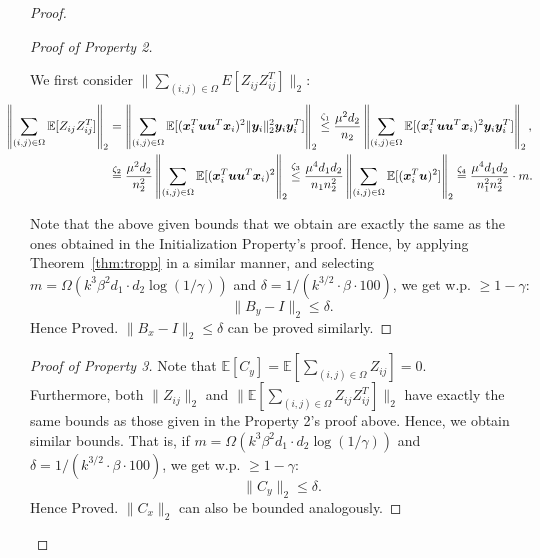 \documentclass[11pt]{article}
\newcommand{\e}{\bm{e}}
\newcommand{\tp}[1]{{#1}^{T}}
\newcommand{\E}{\mathbb{E}}
\renewcommand{\u}{\bm{u}}
\newcommand{\Vot}{\tp{V}_*}
\newcommand{\So}{\Sigma_*}
\newcommand{\Uo}{U_*}
\newcommand{\xti}{\tp{\x}_i}
\newcommand{\yti}{\tp{\y}_i}
\newcommand{\ytj}{\tp{\y}_j}
\newcommand{\Wo}{W_*}
\newcommand{\x}{\bm{x}}
\newcommand{\y}{\bm{y}}
\newcommand{\xit}{\tp{\x}_i}
\newcommand{\yi}{\y_i}
\begin{document}
\begin{proof}
\begin{proof}[Proof of Property 2]
\begin{itemize}
We first consider $\|\sum_{(i,j)\in \Omega}E[Z_{ij}Z_{ij}^T]\|_2$:
\begin{align}
\hspace*{-20pt}\left\|\sum_{(i,j)\in \Omega}\E[Z_{ij}Z_{ij}^T]\right\|_2&=\left\|\sum_{(i,j)\in \Omega}\E[(\xit\u\u^T\x_i)^2\|\y_i\|_2^2 \yi\yti]\right\|_2\stackrel{\zeta_1}{\leq}\frac{\mu^2d_2}{n_2}\left\|\sum_{(i,j)\in \Omega}\E[(\xit\u\u^T\x_i)^2\yi\yti]\right\|_2,\nonumber\\
&\stackrel{\zeta_2}{=}\frac{\mu^2d_2}{n_2^2}\left\|\sum_{(i,j)\in \Omega}\E[(\xit\u\u^T\x_i)^2\right\|_2\stackrel{\zeta_3}{\leq}\frac{\mu^4d_1d_2}{n_1n_2^2}\left\|\sum_{(i,j)\in \Omega}\E[(\xit\u)^2]\right\|_2\stackrel{\zeta_4}{=}\frac{\mu^4d_1d_2}{n_1^2n_2^2}\cdot m.
\end{align}
\end{itemize}
Note that the above given bounds that we obtain are exactly the same as the ones obtained in the Initialization Property's proof. Hence, by applying Theorem~\ref{thm:tropp} in a similar manner, and selecting $m=\Omega(k^3\beta^2 d_1\cdot d_2 \log(1/\gamma))$ and $\delta= 1/(k^{3/2}\cdot \beta\cdot 100)$, we get w.p. $\geq 1-\gamma$: 
$$\|B_y-I\|_2 \leq \delta.$$
Hence Proved. $\|B_x-I\|_2 \leq \delta$ can be proved similarly. 
\end{proof}
\begin{proof}[Proof of Property 3]
Note that $\E[C_y]=\E[\sum_{(i,j)\in \Omega}Z_{ij}]=0$.\\ Furthermore, both $\|Z_{ij}\|_2$ and $\|\E[\sum_{(i,j)\in \Omega} Z_{ij}Z_{ij}^T]\|_2$ have exactly the same bounds as those given in the Property 2's proof above. Hence, we obtain similar bounds. That is, if $m=\Omega(k^3\beta^2 d_1\cdot d_2 \log(1/\gamma))$ and $\delta= 1/(k^{3/2}\cdot \beta\cdot 100)$, we get w.p. $\geq 1-\gamma$: 
$$\|C_y\|_2 \leq \delta.$$
Hence Proved. $\|C_x\|_2$ can also be bounded analogously. 
\end{proof}

\end{proof}
\end{document}
